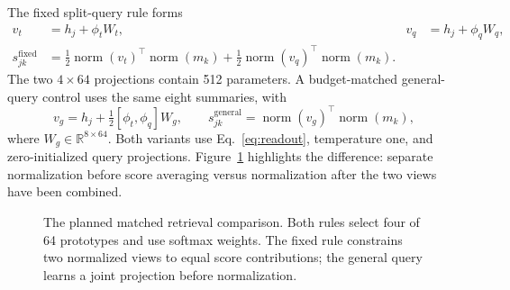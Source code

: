 \documentclass[runningheads]{llncs}
\providecommand{\Description}[1]{}
\newcommand{\Nrm}{\operatorname{norm}}
\begin{document}
The fixed split-query rule forms
\begin{align}
 v_t&=h_j+\phi_t W_t, & v_q&=h_j+\phi_q W_q,\\
 s^{\mathrm{fixed}}_{jk}
 &=\tfrac12\Nrm(v_t)^\top\Nrm(m_k)
   +\tfrac12\Nrm(v_q)^\top\Nrm(m_k).
 \label{eq:fixed}
\end{align}
The two $4\times64$ projections contain 512 parameters. A budget-matched general-query control uses the same eight summaries, with
\begin{equation}
 v_g=h_j+\tfrac12[\phi_t,\phi_q]W_g,\qquad
 s^{\mathrm{general}}_{jk}=\Nrm(v_g)^\top\Nrm(m_k),
 \label{eq:generic}
\end{equation}
where $W_g\in\mathbb{R}^{8\times64}$. Both variants use Eq.~\eqref{eq:readout}, temperature one, and zero-initialized query projections. Figure~\ref{fig:retrieval} highlights the difference: separate normalization before score averaging versus normalization after the two views have been combined.

\begin{figure}[t]
\centering
{}
\caption{The planned matched retrieval comparison. Both rules select four of 64 prototypes and use softmax weights. The fixed rule constrains two normalized views to equal score contributions; the general query learns a joint projection before normalization.}
\label{fig:retrieval}
\Description{Separate normalized time and quantity queries compared with a joint normalized query, each with 512 additional parameters.}
\end{figure}
\end{document}
